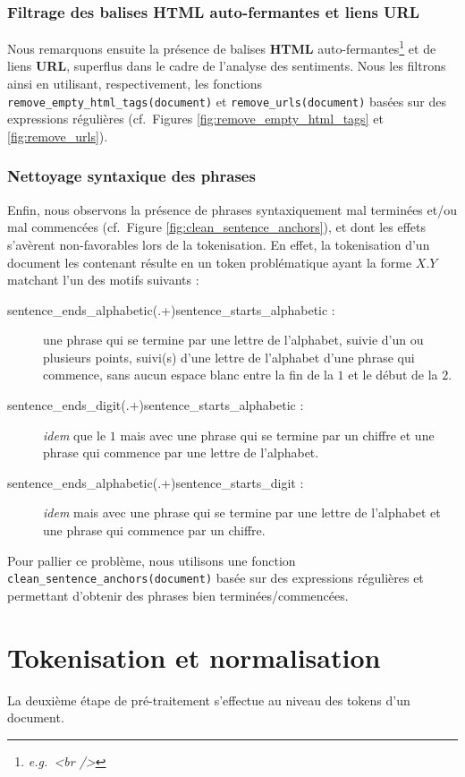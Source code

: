 \documentclass[12pt,a4paper]{report}
\theoremstyle{definition}
\begin{document}
\subsubsection{Filtrage des balises HTML auto-fermantes et liens URL}
Nous remarquons ensuite la présence de balises \textbf{HTML} auto-fermantes\footnote{\emph{e.g.~<br />}} et de liens \textbf{URL}, superflus dans le cadre de l'analyse des sentiments. Nous les filtrons ainsi en utilisant, respectivement, les fonctions \texttt{remove\_empty\_html\_tags(document)} et \texttt{remove\_urls(document)} basées sur des expressions régulières (cf.~Figures \ref{fig:remove_empty_html_tags} et \ref{fig:remove_urls}).

\subsubsection{Nettoyage syntaxique des phrases}
Enfin, nous observons la présence de phrases syntaxiquement mal terminées et/ou mal commencées (cf.~Figure \ref{fig:clean_sentence_anchors}), et dont les effets s'avèrent non-favorables lors de la tokenisation. En effet, la tokenisation d'un document les contenant résulte en un token problématique ayant la forme $X.Y$ matchant l'un des motifs suivants :
\begin{description}
  \item[sentence\_ends\_alphabetic(.+)sentence\_starts\_alphabetic :] une phrase qui se termine par une lettre de l'alphabet, suivie d'un ou plusieurs points, suivi(s) d'une lettre de l'alphabet d'une phrase qui commence, sans aucun espace blanc entre la fin de la $1$\iere{} et le début de la $2$\ieme{}.
  \item[sentence\_ends\_digit(.+)sentence\_starts\_alphabetic :] \emph{idem} que le $1$\ier{} mais avec une phrase qui se termine par un chiffre et une phrase qui commence par une lettre de l'alphabet.
  \item[sentence\_ends\_alphabetic(.+)sentence\_starts\_digit :] \emph{idem} mais avec une phrase qui se termine par une lettre de l'alphabet et une phrase qui commence par un chiffre.
\end{description}

\noindent Pour pallier ce problème, nous utilisons une fonction \texttt{clean\_sentence\_anchors(document)} basée sur des expressions régulières et permettant d'obtenir des phrases bien terminées/commencées.

\section{Tokenisation et normalisation}
La deuxième étape de pré-traitement s'effectue au niveau des tokens d'un document.
\end{document}
